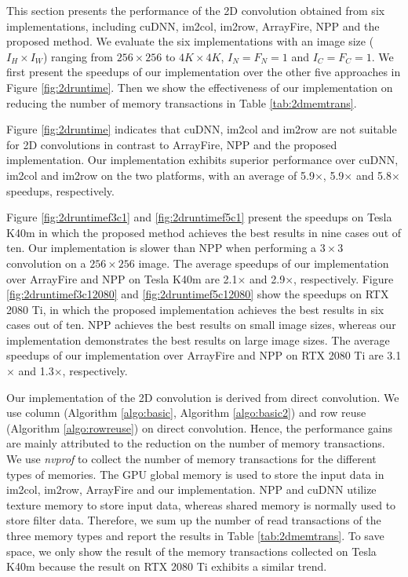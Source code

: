 This section presents the performance of the 2D convolution obtained from six implementations, including cuDNN, im2col, im2row, ArrayFire,
NPP and the proposed method. We evaluate the six implementations with an image size ($I_H \times I_W$) ranging from $256 \times 256$ to $4K \times 4K$, $I_N=F_N=1$ and $I_C=F_C=1$. We first present the speedups of our implementation over the other five approaches in Figure \ref{fig:2druntime}. Then we show the effectiveness of our implementation on reducing the number of memory transactions in Table \ref{tab:2dmemtrans}.

Figure \ref{fig:2druntime} indicates that cuDNN, im2col and im2row are not suitable for 2D convolutions in contrast to ArrayFire, NPP and the proposed implementation. Our implementation exhibits superior performance over cuDNN, im2col and im2row on the
two platforms, with an average of 5.9$\times$, 5.9$\times$ and 5.8$\times$ speedups, respectively.

Figure \ref{fig:2druntimef3c1} and \ref{fig:2druntimef5c1} present the speedups on Tesla K40m in which the proposed method achieves the best results in nine cases out of ten. Our implementation is  slower than NPP when performing a $3 \times 3$ convolution on a $256 \times 256$ image. The average speedups of our implementation over ArrayFire and NPP on Tesla K40m are 2.1$\times$ and 2.9$\times$, respectively.
Figure \ref{fig:2druntimef3c12080} and \ref{fig:2druntimef5c12080} show the speedups on RTX 2080 Ti, in which the proposed implementation achieves the best
results in six cases out of ten. NPP achieves the best results on small image sizes, whereas our implementation demonstrates the
best results on large image sizes. The average speedups of our implementation over ArrayFire and NPP on RTX 2080 Ti are 3.1$\times$ and 1.3$\times$, respectively.

Our implementation of the 2D convolution is derived from direct convolution. We use column (Algorithm \ref{algo:basic}, Algorithm \ref{algo:basic2}) and row reuse (Algorithm \ref{algo:rowreuse}) on direct convolution. Hence, the performance gains are mainly attributed to the reduction on the number of memory transactions. We use \emph{nvprof} to collect the number of memory transactions for the different types of memories. The GPU global memory is used to store the input data in im2col, im2row, ArrayFire and our implementation. NPP and cuDNN utilize texture memory to store input data, whereas shared memory is normally used to store filter data. Therefore, we sum up the number of read transactions of the three memory types and report the results in Table
\ref{tab:2dmemtrans}. To save space, we only show the result of the memory transactions collected on Tesla K40m because the result on RTX 2080 Ti exhibits a similar trend.

